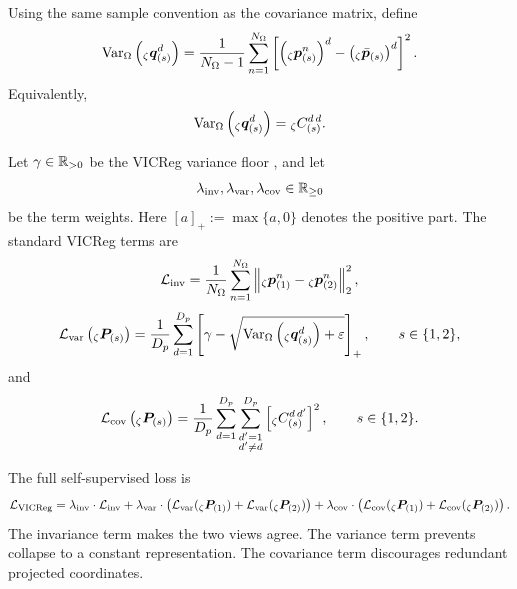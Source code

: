 Using the same sample convention as the covariance matrix, define
\[
  \operatorname{Var}_{\Omega}
  \left(
    {}_{\zeta}\bm{q}_{(s)}^{d}
  \right)
  =
  \frac{1}{N_{\Omega}-1}
  \sum_{n=1}^{N_{\Omega}}
  \left[
    \left(
      {}_{\zeta}\bm{p}_{(s)}^{n}
    \right)^{d}
    -
    \left(
      {}_{\zeta}\bar{\bm{p}}_{(s)}
    \right)^{d}
  \right]^2.
\]
Equivalently,
\[
  \operatorname{Var}_{\Omega}
  \left(
    {}_{\zeta}\bm{q}_{(s)}^{d}
  \right)
  =
  {}_{\zeta}C_{(s)}^{d\,d}.
\]

Let $\gamma\in\mathbb{R}_{>0}$ be the VICReg variance floor%
,
and let
\[
  \lambda_{\mathrm{inv}},
  \lambda_{\mathrm{var}},
  \lambda_{\mathrm{cov}}
  \in
  \mathbb{R}_{\ge 0}
\]
be the term weights.  Here $[a]_+:=\max\{a,0\}$ denotes the positive part.  The
standard VICReg terms%
are
\[
  \mathcal{L}_{\mathrm{inv}}
  =
  \frac{1}{N_{\Omega}}
  \sum_{n=1}^{N_{\Omega}}
  \left\|
    {}_{\zeta}\bm{p}_{(1)}^{n}
    -
    {}_{\zeta}\bm{p}_{(2)}^{n}
  \right\|_2^2,
\]
\[
  \mathcal{L}_{\mathrm{var}}
  \left(
    {}_{\zeta}\bm{P}_{(s)}
  \right)
  =
  \frac{1}{D_p}
  \sum_{d=1}^{D_p}
  \left[
    \gamma
    -
    \sqrt{
      \operatorname{Var}_{\Omega}
      \left(
        {}_{\zeta}\bm{q}_{(s)}^{d}
      \right)
      +
      \varepsilon
    }
  \right]_+,
  \qquad
  s\in\{1,2\},
\]
and
\[
  \mathcal{L}_{\mathrm{cov}}
  \left(
    {}_{\zeta}\bm{P}_{(s)}
  \right)
  =
  \frac{1}{D_p}
  \sum_{d=1}^{D_p}
  \sum_{\substack{d'=1\\d'\ne d}}^{D_p}
  \left[
    {}_{\zeta}C_{(s)}^{d\,d'}
  \right]^2,
  \qquad
  s\in\{1,2\}.
\]

The full self-supervised loss is
\[
  \mathcal{L}_{\mathrm{VICReg}}
  =
  \lambda_{\mathrm{inv}}\cdot\mathcal{L}_{\mathrm{inv}}
  +
  \lambda_{\mathrm{var}}\cdot
  \left(
    \mathcal{L}_{\mathrm{var}}({}_{\zeta}\bm{P}_{(1)})
    +
    \mathcal{L}_{\mathrm{var}}({}_{\zeta}\bm{P}_{(2)})
  \right)
  +
  \lambda_{\mathrm{cov}}\cdot
  \left(
    \mathcal{L}_{\mathrm{cov}}({}_{\zeta}\bm{P}_{(1)})
    +
    \mathcal{L}_{\mathrm{cov}}({}_{\zeta}\bm{P}_{(2)})
  \right).
\]
The invariance term makes the two views agree.  The variance term prevents
collapse to a constant representation.  The covariance term discourages
redundant projected coordinates.

